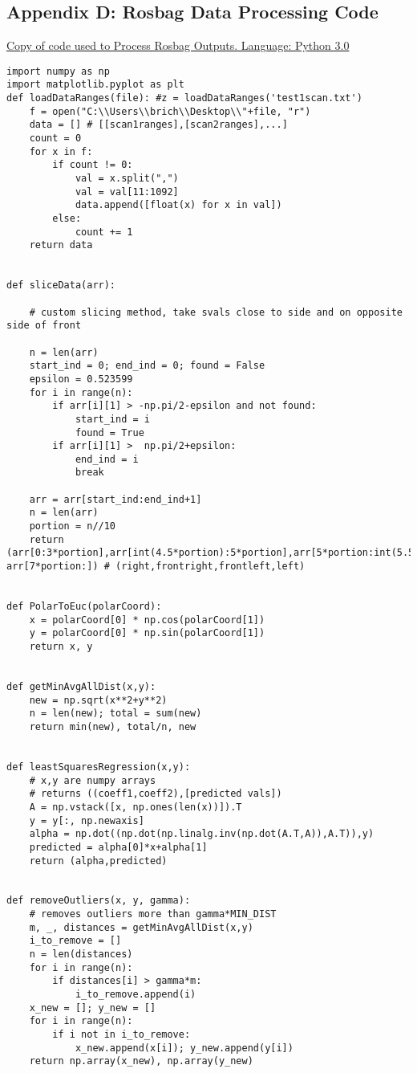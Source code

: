 \documentclass{article}
\begin{document}
\subsection{Appendix D: Rosbag Data Processing Code}
\underline{Copy of code used to Process Rosbag Outputs. Language: Python 3.0}
{\footnotesize
\begin{verbatim}
import numpy as np
import matplotlib.pyplot as plt
def loadDataRanges(file): #z = loadDataRanges('test1scan.txt')
    f = open("C:\\Users\\brich\\Desktop\\"+file, "r")
    data = [] # [[scan1ranges],[scan2ranges],...]
    count = 0
    for x in f:
        if count != 0:
            val = x.split(",")
            val = val[11:1092]
            data.append([float(x) for x in val])
        else:
            count += 1
    return data


def sliceData(arr):

    # custom slicing method, take svals close to side and on opposite side of front

    n = len(arr)
    start_ind = 0; end_ind = 0; found = False
    epsilon = 0.523599
    for i in range(n):
        if arr[i][1] > -np.pi/2-epsilon and not found:
            start_ind = i
            found = True
        if arr[i][1] >  np.pi/2+epsilon:
            end_ind = i
            break
    
    arr = arr[start_ind:end_ind+1]
    n = len(arr)
    portion = n//10
    return (arr[0:3*portion],arr[int(4.5*portion):5*portion],arr[5*portion:int(5.5*portion)], arr[7*portion:]) # (right,frontright,frontleft,left)


def PolarToEuc(polarCoord):
    x = polarCoord[0] * np.cos(polarCoord[1])
    y = polarCoord[0] * np.sin(polarCoord[1])
    return x, y


def getMinAvgAllDist(x,y):
    new = np.sqrt(x**2+y**2)
    n = len(new); total = sum(new)
    return min(new), total/n, new


def leastSquaresRegression(x,y):
    # x,y are numpy arrays
    # returns ((coeff1,coeff2),[predicted vals])
    A = np.vstack([x, np.ones(len(x))]).T
    y = y[:, np.newaxis]
    alpha = np.dot((np.dot(np.linalg.inv(np.dot(A.T,A)),A.T)),y)
    predicted = alpha[0]*x+alpha[1]
    return (alpha,predicted)


def removeOutliers(x, y, gamma):
    # removes outliers more than gamma*MIN_DIST
    m, _, distances = getMinAvgAllDist(x,y)
    i_to_remove = []
    n = len(distances)
    for i in range(n):
        if distances[i] > gamma*m:
            i_to_remove.append(i)
    x_new = []; y_new = []
    for i in range(n):
        if i not in i_to_remove:
            x_new.append(x[i]); y_new.append(y[i])
    return np.array(x_new), np.array(y_new)



\end{verbatim}}
\end{document}
